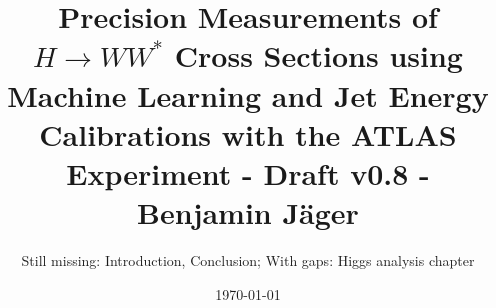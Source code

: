 

\endofdump


% 

\newif\ifIMAGES
\IMAGEStrue




\newcommand{\paperfiguredir}{figures/paper-figures}

\author{Still missing: Introduction, Conclusion; With gaps: Higgs analysis chapter}
\date{\today}
\title{Precision Measurements of $H \to WW^*$ Cross Sections using Machine Learning and Jet Energy Calibrations with the ATLAS Experiment - Draft v0.8 - Benjamin Jäger}





\maketitle





\tableofcontents


\newcommand{\chapterdir}{chapters}
%



